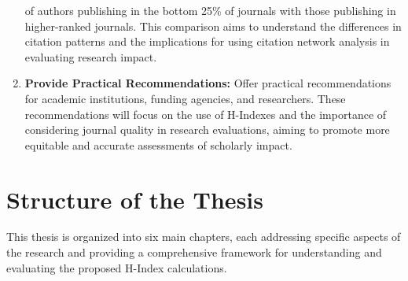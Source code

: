 \begin{enumerate}
    of authors publishing in the bottom 25\% of journals with those publishing in higher-ranked journals.
    This comparison aims to understand the differences in citation patterns and the implications for using
    citation network analysis in evaluating research impact.
    \item \textbf{Provide Practical Recommendations:} Offer practical recommendations for academic institutions,
    funding agencies, and researchers. These recommendations will focus on the use of H-Indexes and the importance of
    considering journal quality in research evaluations, aiming to promote more equitable and accurate assessments of scholarly impact.
\end{enumerate}

\section{Structure of the Thesis}
This thesis is organized into six main chapters, each addressing specific aspects of the research and providing a comprehensive framework for understanding and evaluating the proposed H-Index calculations.
